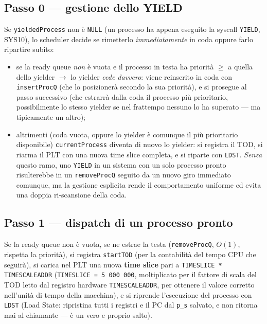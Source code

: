 \documentclass[11pt,a4paper]{article}
\newcommand{\code}[1]{\texttt{#1}}
\begin{document}
\subsection{Passo 0 --- gestione dello YIELD}
\label{sub:yield-scheduler}
Se \code{yieldedProcess} non è \code{NULL} (un processo ha appena eseguito
la syscall \code{YIELD}, SYS10), lo scheduler decide se rimetterlo
\emph{immediatamente} in coda oppure farlo ripartire subito:
\begin{itemize}
\item se la ready queue \emph{non} è vuota e il processo in testa ha
  priorità $\ge$ a quella dello yielder $\to$ lo yielder \emph{cede
  davvero}: viene reinserito in coda con \code{insertProcQ} (che lo
  posizionerà secondo la sua priorità), e si prosegue al passo successivo
  (che estrarrà dalla coda il processo più prioritario, possibilmente lo
  stesso yielder se nel frattempo nessuno lo ha superato --- ma tipicamente
  un altro);
\item altrimenti (coda vuota, oppure lo yielder è comunque il più
  prioritario disponibile) \code{currentProcess} diventa di nuovo lo
  yielder: si registra il TOD, si riarma il PLT con una nuova time slice
  completa, e si riparte con \code{LDST}. \emph{Senza} questo ramo, uno
  \code{YIELD} in un sistema con un solo processo pronto risulterebbe in un
  \code{removeProcQ} seguito da un nuovo giro immediato comunque, ma la
  gestione esplicita rende il comportamento uniforme ed evita una doppia
  ri-scansione della coda.
\end{itemize}

\subsection{Passo 1 --- dispatch di un processo pronto}
Se la ready queue non è vuota, se ne estrae la testa
(\code{removeProcQ}, $O(1)$, rispetta la priorità), si registra
\code{startTOD} (per la contabilità del tempo CPU che seguirà), si carica
nel PLT una nuova \textbf{time slice} pari a \code{TIMESLICE *
TIMESCALEADDR} (\code{TIMESLICE = 5\,000\,000}, moltiplicato per il fattore
di scala del TOD letto dal registro hardware \code{TIMESCALEADDR}, per
ottenere il valore corretto nell'unità di tempo della macchina), e si
riprende l'esecuzione del processo con \code{LDST} (Load State: ripristina
tutti i registri e il PC dal \code{p\_s} salvato, e non ritorna mai al
chiamante --- è un vero e proprio salto).
\end{document}

